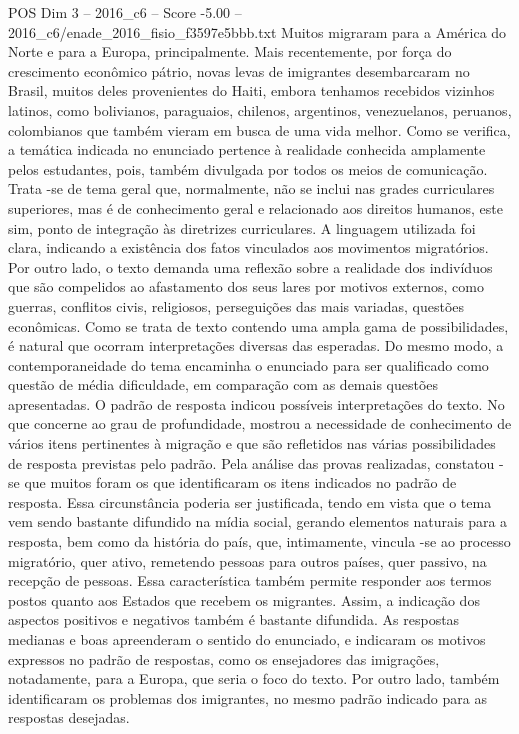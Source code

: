\begin{textsample}{POS Dim 3 – 2016\_c6 – Score -5.00 – 2016\_c6/enade\_2016\_fisio\_f3597e5bbb.txt}
Muitos migraram para a América do Norte e para a Europa, principalmente.
Mais recentemente, por força do crescimento econômico pátrio, novas levas de imigrantes desembarcaram no Brasil, muitos deles provenientes do Haiti, embora tenhamos recebidos vizinhos latinos, como bolivianos, paraguaios, chilenos, argentinos, venezuelanos, peruanos, colombianos que também vieram em busca de uma vida melhor.
Como se verifica, a temática indicada no enunciado pertence à realidade conhecida amplamente pelos estudantes, pois, também divulgada por todos os meios de comunicação.
Trata -se de tema geral que, normalmente, não se inclui nas grades curriculares superiores, mas é de conhecimento geral e relacionado aos direitos humanos, este sim, ponto de integração às diretrizes curriculares.
A linguagem utilizada foi clara, indicando a existência dos fatos vinculados aos movimentos migratórios.
Por outro lado, o texto demanda uma reflexão sobre a realidade dos indivíduos que são compelidos ao afastamento dos seus lares por motivos externos, como guerras, conflitos civis, religiosos, perseguições das mais variadas, questões econômicas.
Como se trata de texto contendo uma ampla gama de possibilidades, é natural que ocorram interpretações diversas das esperadas.
Do mesmo modo, a contemporaneidade do tema encaminha o enunciado para ser qualificado como questão de média dificuldade, em comparação com as demais questões apresentadas.
O padrão de resposta indicou possíveis interpretações do texto.
No que concerne ao grau de profundidade, mostrou a necessidade de conhecimento de vários itens pertinentes à migração e que são refletidos nas várias possibilidades de resposta previstas pelo padrão.
Pela análise das provas realizadas, constatou -se que muitos foram os que identificaram os itens indicados no padrão de resposta.
Essa circunstância poderia ser justificada, tendo em vista que o tema vem sendo bastante difundido na mídia social, gerando elementos naturais para a resposta, bem como da história do país, que, intimamente, vincula -se ao processo migratório, quer ativo, remetendo pessoas para outros países, quer passivo, na recepção de pessoas.
Essa característica também permite responder aos termos postos quanto aos Estados que recebem os migrantes.
Assim, a indicação dos aspectos positivos e negativos também é bastante difundida.
As respostas medianas e boas apreenderam o sentido do enunciado, e indicaram os motivos expressos no padrão de respostas, como os ensejadores das imigrações, notadamente, para a Europa, que seria o foco do texto.
Por outro lado, também identificaram os problemas dos imigrantes, no mesmo padrão indicado para as respostas desejadas.

\end{textsample}
